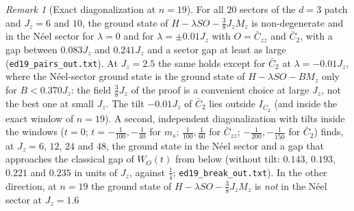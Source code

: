 \documentclass[aps,prx,onecolumn,10pt,nofootinbib,longbibliography,floatfix]{revtex4-2}
\theoremstyle{remark}
\newtheorem*{remark}{Remark}
\newcommand{\Jz}{J_z}
\newcommand{\ms}{m_s}
\newcommand{\Czz}{\bar C_{zz}}
\newcommand{\Ctwo}{\bar C_{2}}
\begin{document}
\begin{remark}[Exact diagonalization at $n=19$] %
For all $20$ sectors of the $d=3$ patch and $\Jz=6$ and $10$, the ground state of $H-\lambda SO-\frac38\Jz M_z$ is %
non-degenerate and in the N\'eel sector for $\lambda=0$ and for $\lambda=\pm0.01\Jz$ with $O=\Czz$ and %
$\Ctwo$, with a gap between $0.083\Jz$ and $0.241\Jz$ and a sector gap at least as large %
(\texttt{ed19\_pairs\_out.txt}). At $\Jz=2.5$ the same holds except for $\Ctwo$ at $\lambda=-0.01\Jz$, where the %
N\'eel-sector ground state is the ground state of $H-\lambda SO-BM_z$ only for $B<0.370\Jz$: the field $\frac38\Jz$ of %
the proof is a convenient choice at large $\Jz$, not the best one at small $\Jz$. The tilt $-0.01\Jz$ of %
$\Ctwo$ lies outside $I_{\Ctwo}$ (and inside the exact window of $n=19$). A second, independent diagonalization %
with tilts inside the windows ($t=0$; $t=-\frac1{100},-\frac1{40}$ for $\ms$; $\frac1{100},\frac1{60}$ for %
$\Czz$; $-\frac1{200},-\frac1{150}$ for $\Ctwo$) finds, at $\Jz=6$, $12$, $24$ and $48$, the ground state in %
the N\'eel sector and a gap that approaches the classical gap of $W_O(t)$ from below (without tilt: $0.143$, %
$0.193$, $0.221$ and $0.235$ in units of $\Jz$, against $\frac14$; \texttt{ed19\_break\_out.txt}). In the other %
direction, at $n=19$ the ground state of $H-\lambda SO-\frac38\Jz M_z$ is \emph{not} in the N\'eel sector at $\Jz=1.6$ %

\end{remark}
\end{document}
